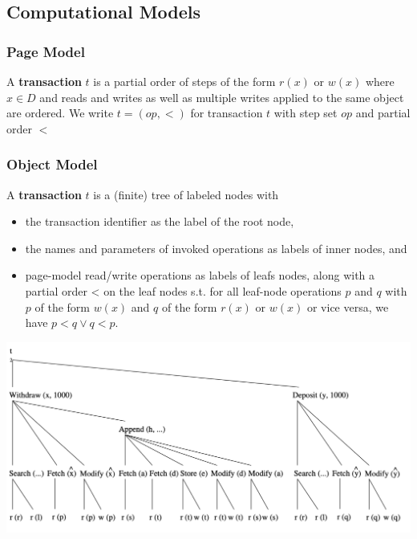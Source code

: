 \documentclass[11pt]{article}
\begin{document}
\subsection{Computational Models}
\label{sec:orgb394ac6}
\subsubsection{Page Model}
\label{sec:org0daf5ac}
\begin{definition}
A \textbf{transaction} \(t\) is a partial order of steps of the form \(r(x)\) or \(w(x)\)
where \(x\in D\) and reads and writes as well as multiple writes applied to the same object are
ordered. We write \(t=(op,<)\) for transaction \(t\) with step set \(op\) and partial order \(<\)
\end{definition}
\subsubsection{Object Model}
\label{sec:org056d3ac}
\begin{definition}
A \textbf{transaction} \(t\) is a (finite) tree of labeled nodes with
\begin{itemize}
\item the transaction identifier as the label of the root node,
\item the names and parameters of invoked operations as labels of inner nodes, and
\item page-model read/write operations as labels of leafs nodes, along with a partial order < on the
leaf nodes s.t. for all leaf-node operations \(p\) and \(q\) with \(p\) of the form \(w(x)\)
and \(q\) of the form \(r(x)\) or \(w(x)\) or vice versa, we have \(p<q\vee q<p\).
\end{itemize}
\end{definition}

\begin{center}
\includegraphics[width=.8\textwidth]{../images/bigdatabase/1.png}
\label{}
\end{center}
\end{document}
